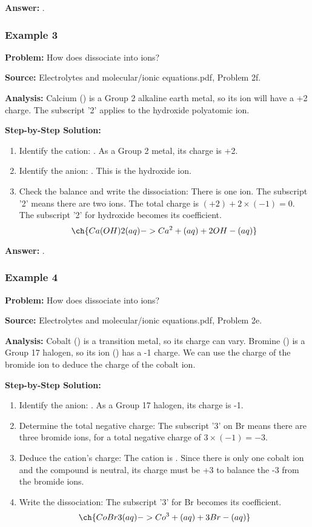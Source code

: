 \documentclass{article}
\begin{document}
\textbf{Answer:} \textbf{}.

\subsubsection{Example 3}
\textbf{Problem:} How does  dissociate into ions?

\textbf{Source:} Electrolytes and molecular/ionic equations.pdf, Problem 2f.

\textbf{Analysis:} Calcium () is a Group 2 alkaline earth metal, so its ion will have a +2 charge. The subscript '2' applies to the hydroxide polyatomic ion.

\textbf{Step-by-Step Solution:}
\begin{enumerate}
    \item Identify the cation: . As a Group 2 metal, its charge is +2.
    \item Identify the anion: . This is the hydroxide ion.
    \item Check the balance and write the dissociation: There is one  ion. The subscript '2' means there are two  ions. The total charge is $(+2) + 2 \times (-1) = 0$. The subscript '2' for hydroxide becomes its coefficient.
    \[ \ch{Ca(OH)2(aq) -> Ca^2+(aq) + 2OH-(aq)} \]
\end{enumerate}

\textbf{Answer:} \textbf{}.

\subsubsection{Example 4}
\textbf{Problem:} How does  dissociate into ions?

\textbf{Source:} Electrolytes and molecular/ionic equations.pdf, Problem 2e.

\textbf{Analysis:} Cobalt () is a transition metal, so its charge can vary. Bromine () is a Group 17 halogen, so its ion () has a -1 charge. We can use the charge of the bromide ion to deduce the charge of the cobalt ion.

\textbf{Step-by-Step Solution:}
\begin{enumerate}
    \item Identify the anion: . As a Group 17 halogen, its charge is -1.
    \item Determine the total negative charge: The subscript '3' on Br means there are three bromide ions, for a total negative charge of $3 \times (-1) = -3$.
    \item Deduce the cation's charge: The cation is . Since there is only one cobalt ion and the compound is neutral, its charge must be +3 to balance the -3 from the bromide ions.
    \item Write the dissociation: The subscript '3' for Br becomes its coefficient.
    \[ \ch{CoBr3(aq) -> Co^3+(aq) + 3Br-(aq)} \]
\end{enumerate}
\end{document}
